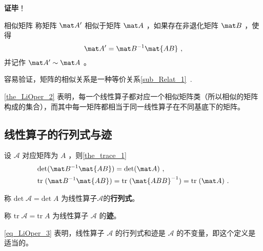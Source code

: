 \textbf{证毕}！


\begin{definition}{相似矩阵}
称矩阵 $\mat A'$ 相似于矩阵 $\mat A$ ，如果存在非退化矩阵 $\mat B$ ，使得
\begin{equation}
\mat A'=\mat B^{-1}\mat{AB}~,
\end{equation}
并记作 $\mat A'\sim \mat A$ 。
\end{definition}
容易验证，矩阵的相似关系是一种等价关系\autoref{sub_Relat_1}~.

\autoref{the_LiOper_2} 表明，每一个线性算子都对应一个相似矩阵类（所以相似的矩阵构成的集合），而其中每一矩阵都相当于同一线性算子在不同基底下的矩阵。

\subsection{线性算子的行列式与迹}\label{sub_LiOper_2}
设 $\mathcal{A}$ 对应矩阵为 $A$ ，则\autoref{the_trace_1}~ 
\begin{equation}\label{eq_LiOper_3}
\begin{aligned}
&\mathrm{det}(\mat B^{-1}\mat{AB})=\mathrm{det}(\mat A)~,\\
&\mathrm{tr}\;(\mat B^{-1}\mat{AB})=\mathrm{tr}\;(\mat{ABB}^{-1})=\mathrm{tr}\;(\mat A)~.
\end{aligned}
\end{equation}
\begin{definition}{}
称
$
\mathrm{det}\;\mathcal{A}=\mathrm{det}\;A
$
为线性算子$\mathcal{A}$的\textbf{行列式}。

称
$
\mathrm{tr}\;\mathcal{A}=\mathrm{tr}\;A
$
为线性算子 $\mathcal{A}$ 的\textbf{迹}。
\end{definition}
\autoref{eq_LiOper_3} 表明，线性算子 $\mathcal{A}$ 的行列式和迹是 $\mathcal{A}$ 的不变量，即这个定义是适当的。


